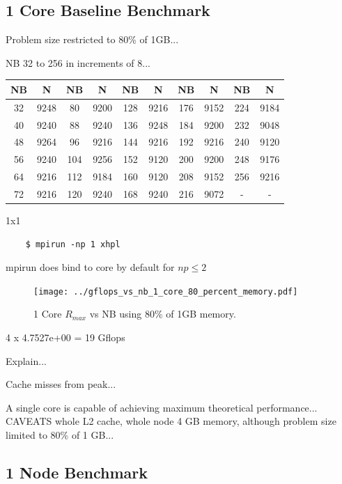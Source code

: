 \documentclass{article}
\begin{document}
\subsection{1 Core Baseline Benchmark}

Problem size restricted to 80\% of 1GB...

NB 32 to 256 in increments of 8...

\begin{center}
	\begin{tabular}{ |c|c|c|c|c|c|c|c|c|c| } 
		\hline
		NB & N & NB & N & NB & N & NB & N & NB & N \\ 
		\hline
		32 & 9248 &  80 & 9200 & 128 & 9216 & 176 & 9152 & 224 & 9184 \\ 
		40 & 9240 &  88 & 9240 & 136 & 9248 & 184 & 9200 & 232 & 9048 \\ 
 		48 & 9264 &  96 & 9216 & 144 & 9216 & 192 & 9216 & 240 & 9120 \\
		56 & 9240 & 104 & 9256 & 152 & 9120 & 200 & 9200 & 248 & 9176 \\ 
 		64 & 9216 & 112 & 9184 & 160 & 9120 & 208 & 9152 & 256 & 9216 \\
		72 & 9216 & 120 & 9240 & 168 & 9240 & 216 & 9072 &   - &    - \\ 
 		\hline
	\end{tabular}
\end{center}

1x1

\begin{verbatim}
    $ mpirun -np 1 xhpl
\end{verbatim}

mpirun does bind to core by default for $np \leq 2$

\begin{figure}
	\centering	
	\texttt{[image: ../gflops\_vs\_nb\_1\_core\_80\_percent\_memory.pdf]}
	\caption{1 Core $R_{max}$ vs NB using 80\% of 1GB memory.}
\end{figure}

4 x 4.7527e+00 = 19 Gflops

Explain...

Cache misses from peak...

A single core is capable of achieving maximum theoretical performance... CAVEATS whole L2 cache, whole node 4 GB memory, although problem size limited to 80\% of 1 GB...  


\subsection{1 Node Benchmark}
\end{document}
